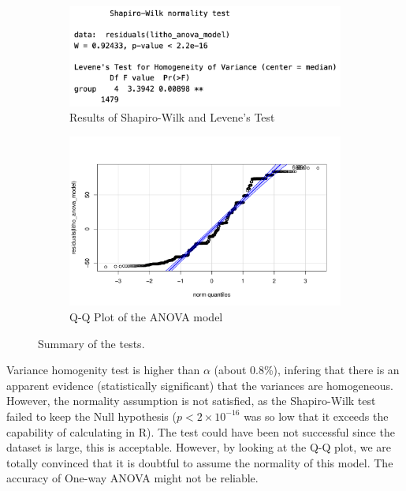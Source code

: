 \begin{figure}[H]
    \centering
    \begin{subfigure}[b]{0.6\textwidth}
        \centering
        \includegraphics[width=\textwidth]{./graphics/anova_litho_shapiro_wilk.png}
        \caption{Results of Shapiro-Wilk and Levene's Test}
        \label{fig:anova_litho_shapiro_wilk}
    \end{subfigure}
    \begin{subfigure}[b]{0.35\textwidth}
        \centering
        \includegraphics[width=\textwidth]{./graphics/anova_litho_qqplot.pdf}
        \caption{Q-Q Plot of the ANOVA model}
        \label{fig:anova_litho_shapiro_wilk}
    \end{subfigure}
    \caption{Summary of the tests.}
\end{figure}

Variance homogenity test is higher than $\alpha$ (about 0.8\%), infering that there is an apparent
evidence (statistically significant) that the variances are homogeneous. However, the normality assumption is not satisfied, as the Shapiro-Wilk
test failed to keep the Null hypothesis ($p < 2\times10^{-16}$ was so low that it exceeds the capability of calculating in R). The test could have been
not successful since the dataset is large, this is acceptable. However, by looking at the Q-Q plot, we are totally convinced that it is doubtful to
assume the normality of this model. The accuracy of One-way ANOVA might not be reliable.


